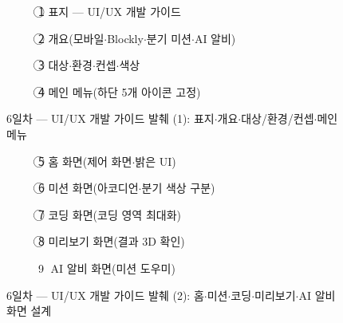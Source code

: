 \begin{figure}[htbp]\centering
  \begin{subfigure}{0.48\linewidth}\centering
    \caption{\textcircled{1} 표지 — UI/UX 개발 가이드}
  \end{subfigure}\hfill
  \begin{subfigure}{0.48\linewidth}\centering
    \caption{\textcircled{2} 개요(모바일$\cdot$Blockly$\cdot$분기 미션$\cdot$AI 알비)}
  \end{subfigure}

  \medskip
  \begin{subfigure}{0.48\linewidth}\centering
    \caption{\textcircled{3} 대상$\cdot$환경$\cdot$컨셉$\cdot$색상}
  \end{subfigure}\hfill
  \begin{subfigure}{0.48\linewidth}\centering
    \caption{\textcircled{4} 메인 메뉴(하단 5개 아이콘 고정)}
  \end{subfigure}
  \caption{6일차 — UI/UX 개발 가이드 발췌 (1): 표지$\cdot$개요$\cdot$대상/환경/컨셉$\cdot$메인 메뉴}
\end{figure}

\begin{figure}[htbp]\centering
  \begin{subfigure}{0.48\linewidth}\centering
    \caption{\textcircled{5} 홈 화면(제어 화면$\cdot$밝은 UI)}
  \end{subfigure}\hfill
  \begin{subfigure}{0.48\linewidth}\centering
    \caption{\textcircled{6} 미션 화면(아코디언$\cdot$분기 색상 구분)}
  \end{subfigure}

  \medskip
  \begin{subfigure}{0.48\linewidth}\centering
    \caption{\textcircled{7} 코딩 화면(코딩 영역 최대화)}
  \end{subfigure}\hfill
  \begin{subfigure}{0.48\linewidth}\centering
    \caption{\textcircled{8} 미리보기 화면(결과 3D 확인)}
  \end{subfigure}

  \medskip
  \begin{subfigure}{0.48\linewidth}\centering
    \caption{\textcircled{9} AI 알비 화면(미션 도우미)}
  \end{subfigure}
  \caption{6일차 — UI/UX 개발 가이드 발췌 (2): 홈$\cdot$미션$\cdot$코딩$\cdot$미리보기$\cdot$AI 알비 화면 설계}
\end{figure}


